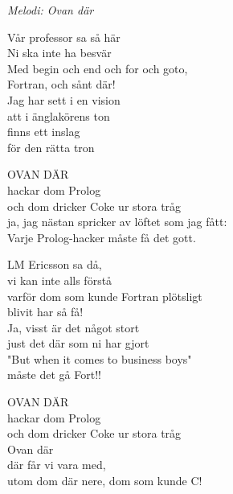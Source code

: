 {\footnotesize\textit{Melodi: Ovan där}}\par
\vspace{10pt}
Vår professor sa så här\\
Ni ska inte ha besvär\\
Med begin och end och for och goto,\\
Fortran, och sånt där!\\
Jag har sett i en vision\\
att i änglakörens ton\\
finns ett inslag\\
för den rätta tron\par
\vspace{10pt}
OVAN DÄR\\
hackar dom Prolog\\
och dom dricker Coke ur stora tråg\\
ja, jag nästan spricker av löftet som jag fått:\\
Varje Prolog-hacker måste få det gott.\par
\vspace{10pt}
LM Ericsson sa då,\\
vi kan inte alls förstå\\
varför dom som kunde Fortran plötsligt\\
blivit har så få!\\
Ja, visst är det något stort\\
just det där som ni har gjort\\
"But when it comes to business boys"\\
måste det gå Fort!!\par
\vspace{10pt}
OVAN DÄR\\
hackar dom Prolog\\
och dom dricker Coke ur stora tråg\\
Ovan där\\
där får vi vara med,\\
utom dom där nere, dom som kunde C!
